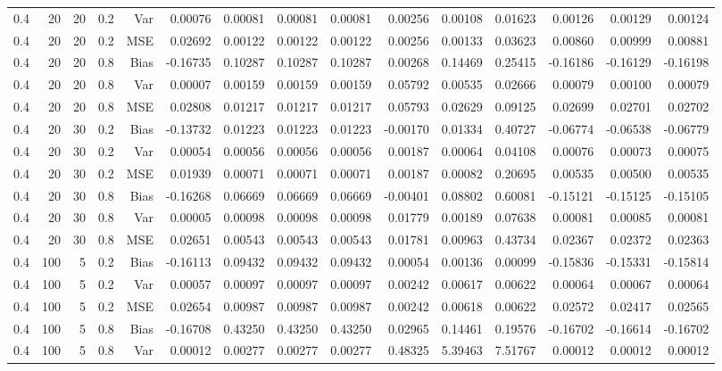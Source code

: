 \begin{table}[!htbp]
\begin{tabular}{lrrrrrrrrrrrrrr}
0.4 &  20 & 20 & 0.2 & Var & 0.00076 & 0.00081 & 0.00081 & 0.00081 & 0.00256 & 0.00108 & 0.01623 & 0.00126 & 0.00129 & 0.00124 \\
0.4 &  20 & 20 & 0.2 & MSE & 0.02692 & 0.00122 & 0.00122 & 0.00122 & 0.00256 & 0.00133 & 0.03623 & 0.00860 & 0.00999 & 0.00881 \\
0.4 &  20 & 20 & 0.8 & Bias & -0.16735 & 0.10287 & 0.10287 & 0.10287 & 0.00268 & 0.14469 & 0.25415 & -0.16186 & -0.16129 & -0.16198 \\
0.4 &  20 & 20 & 0.8 & Var & 0.00007 & 0.00159 & 0.00159 & 0.00159 & 0.05792 & 0.00535 & 0.02666 & 0.00079 & 0.00100 & 0.00079 \\
0.4 &  20 & 20 & 0.8 & MSE & 0.02808 & 0.01217 & 0.01217 & 0.01217 & 0.05793 & 0.02629 & 0.09125 & 0.02699 & 0.02701 & 0.02702 \\
0.4 &  20 & 30 & 0.2 & Bias & -0.13732 & 0.01223 & 0.01223 & 0.01223 & -0.00170 & 0.01334 & 0.40727 & -0.06774 & -0.06538 & -0.06779 \\
0.4 &  20 & 30 & 0.2 & Var & 0.00054 & 0.00056 & 0.00056 & 0.00056 & 0.00187 & 0.00064 & 0.04108 & 0.00076 & 0.00073 & 0.00075 \\
0.4 &  20 & 30 & 0.2 & MSE & 0.01939 & 0.00071 & 0.00071 & 0.00071 & 0.00187 & 0.00082 & 0.20695 & 0.00535 & 0.00500 & 0.00535 \\
0.4 &  20 & 30 & 0.8 & Bias & -0.16268 & 0.06669 & 0.06669 & 0.06669 & -0.00401 & 0.08802 & 0.60081 & -0.15121 & -0.15125 & -0.15105 \\
0.4 &  20 & 30 & 0.8 & Var & 0.00005 & 0.00098 & 0.00098 & 0.00098 & 0.01779 & 0.00189 & 0.07638 & 0.00081 & 0.00085 & 0.00081 \\
0.4 &  20 & 30 & 0.8 & MSE & 0.02651 & 0.00543 & 0.00543 & 0.00543 & 0.01781 & 0.00963 & 0.43734 & 0.02367 & 0.02372 & 0.02363 \\
0.4 & 100 &  5 & 0.2 & Bias & -0.16113 & 0.09432 & 0.09432 & 0.09432 & 0.00054 & 0.00136 & 0.00099 & -0.15836 & -0.15331 & -0.15814 \\
0.4 & 100 &  5 & 0.2 & Var & 0.00057 & 0.00097 & 0.00097 & 0.00097 & 0.00242 & 0.00617 & 0.00622 & 0.00064 & 0.00067 & 0.00064 \\
0.4 & 100 &  5 & 0.2 & MSE & 0.02654 & 0.00987 & 0.00987 & 0.00987 & 0.00242 & 0.00618 & 0.00622 & 0.02572 & 0.02417 & 0.02565 \\
0.4 & 100 &  5 & 0.8 & Bias & -0.16708 & 0.43250 & 0.43250 & 0.43250 & 0.02965 & 0.14461 & 0.19576 & -0.16702 & -0.16614 & -0.16702 \\
0.4 & 100 &  5 & 0.8 & Var & 0.00012 & 0.00277 & 0.00277 & 0.00277 & 0.48325 & 5.39463 & 7.51767 & 0.00012 & 0.00012 & 0.00012 \\

\end{tabular}
\end{table}
